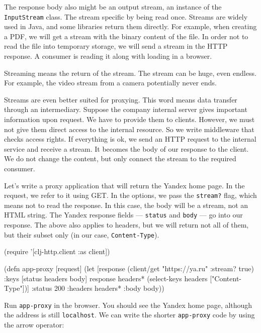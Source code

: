 The response body also might be an output stream, an instance of the \verb|InputStream| class. The stream specific by being read once. Streams are widely used in Java, and some libraries return them directly. For example, when creating a PDF, we will get a stream with the binary content of the file. In order not to read the file into temporary storage, we will send a stream in the HTTP response. A consumer is reading it along with loading in a browser.

Streaming means the return of the stream. The stream can be huge, even endless. For example, the video stream from a camera potentially never ends.

Streams are even better suited for proxying. This word means data transfer through an intermediary. Suppose the company internal server gives important information upon request. We have to provide them to clients. However, we must not give them direct access to the internal resource. So we write middleware that checks access rights. If everything is ok, we send an HTTP request to the internal service and receive a stream. It becomes the body of our response to the client. We do not change the content, but only connect the stream to the required consumer.

Let's write a proxy application that will return the Yandex home page. In the request, we refer to it using GET. In the options, we pass the \verb|stream?| flag, which means not to read the response. In this case, the body will be a stream, not an HTML string. The Yandex response fields — \verb|status| and \verb|body| — go into our response. The above also applies to headers, but we will return not all of them, but their subset only (in our case, \verb|Content-Type|).

\begin{english}
\begin{clojure}
(require '[clj-http.client :as client])

(defn app-proxy [request]
(let [response (client/get "https://ya.ru" {:stream? true})
{:keys [status headers body]} response
headers* (select-keys headers ["Content-Type"])]
{:status 200
:headers headers*
:body body}))
\end{clojure}
\end{english}

Run \verb|app-proxy| in the browser. You should see the Yandex home page, although the address is still \verb|localhost|. We can write the shorter \verb|app-proxy| code by using the arrow operator:

